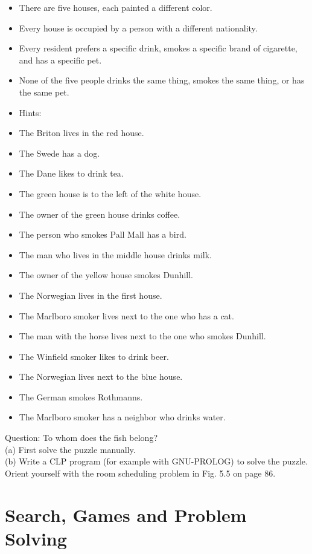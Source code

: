 \documentclass[10pt]{article}
\begin{document}
\begin{itemize}
  \item There are five houses, each painted a different color.
  \item Every house is occupied by a person with a different nationality.
  \item Every resident prefers a specific drink, smokes a specific brand of cigarette, and has a specific pet.
  \item None of the five people drinks the same thing, smokes the same thing, or has the same pet.
  \item Hints:
  \item The Briton lives in the red house.
  \item The Swede has a dog.
  \item The Dane likes to drink tea.
  \item The green house is to the left of the white house.
  \item The owner of the green house drinks coffee.
  \item The person who smokes Pall Mall has a bird.
  \item The man who lives in the middle house drinks milk.
  \item The owner of the yellow house smokes Dunhill.
  \item The Norwegian lives in the first house.
  \item The Marlboro smoker lives next to the one who has a cat.
  \item The man with the horse lives next to the one who smokes Dunhill.
  \item The Winfield smoker likes to drink beer.
  \item The Norwegian lives next to the blue house.
  \item The German smokes Rothmanns.
  \item The Marlboro smoker has a neighbor who drinks water.
\end{itemize}

Question: To whom does the fish belong?\\
(a) First solve the puzzle manually.\\
(b) Write a CLP program (for example with GNU-PROLOG) to solve the puzzle. Orient yourself with the room scheduling problem in Fig. 5.5 on page 86.

\section*{Search, Games and Problem Solving}
\end{document}
